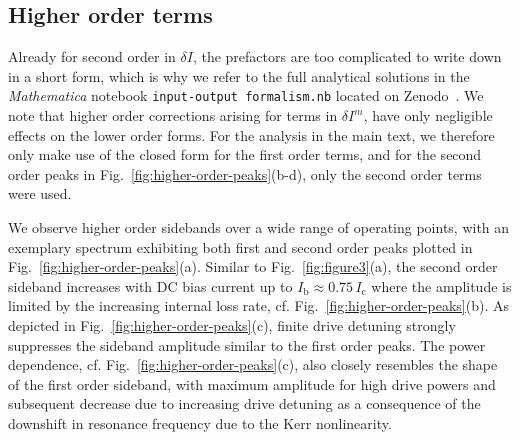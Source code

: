 \subsection{Higher order terms}\label{app:higher-orders}
% 
Already for second order in $\delta I$, the prefactors are too complicated to write down in a short form, which is why we refer to the full analytical solutions in the \textit{Mathematica} notebook \texttt{input-output formalism.nb} located on Zenodo~\cite{schmidtDataProcessingCurrent2020}.
% 
We note that higher order corrections arising for terms in $\delta I^m$, have only negligible effects on the lower order forms.
% 
For the analysis in the main text, we therefore only make use of the closed form for the first order terms, and for the second order peaks in Fig.~\ref{fig:higher-order-peaks}(b-d), only the second order terms were used.

We observe higher order sidebands over a wide range of operating points, with an exemplary spectrum exhibiting both first and second order peaks plotted in Fig.~\ref{fig:higher-order-peaks}(a).
% 
Similar to Fig.~\ref{fig:figure3}(a), the second order sideband increases with DC bias current up to $I_\text{b}\approx 0.75\, I_\text{c}$ where the amplitude is limited by the increasing internal loss rate, cf. Fig.~\ref{fig:higher-order-peaks}(b).
%
As depicted in Fig.~\ref{fig:higher-order-peaks}(c), finite drive detuning strongly suppresses the sideband amplitude similar to the first order peaks.
% 
The power dependence, cf. Fig.~\ref{fig:higher-order-peaks}(c), also closely resembles the shape of the first order sideband, with maximum amplitude for high drive powers and subsequent decrease due to increasing drive detuning as a consequence of the downshift in resonance frequency due to the Kerr nonlinearity.

